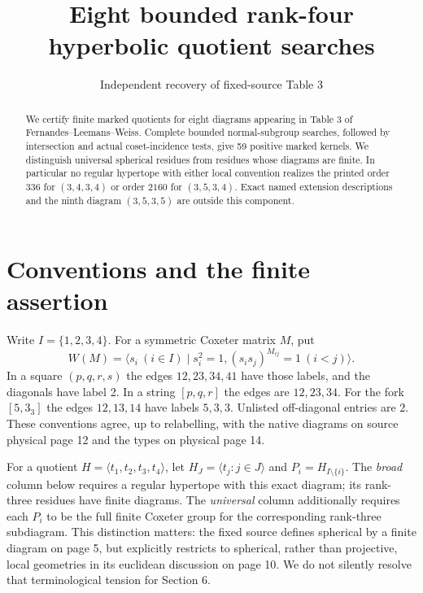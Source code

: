 \documentclass[11pt]{article}
\title{Eight bounded rank-four hyperbolic quotient searches}
\author{Independent recovery of fixed-source Table 3}
\date{}
\begin{document}
\maketitle
\begin{abstract}
We certify finite marked quotients for eight diagrams appearing in Table 3
of Fernandes--Leemans--Weiss. Complete bounded normal-subgroup searches,
followed by intersection and actual coset-incidence tests, give 59 positive
marked kernels. We distinguish universal spherical residues from residues
whose diagrams are finite. In particular no regular hypertope with either
local convention realizes the printed order $336$ for $(3,4,3,4)$ or order $2160$
for $(3,5,3,4)$. Exact named extension descriptions and the ninth diagram
$(3,5,3,5)$ are outside this component.
\end{abstract}

\section{Conventions and the finite assertion}
Write $I=\{1,2,3,4\}$. For a symmetric Coxeter matrix $M$, put
\[
 W(M)=\langle s_i\ (i\in I)\mid s_i^2=1,
                     (s_i s_j)^{M_{ij}}=1\ (i<j)\rangle.
\]
In a square $(p,q,r,s)$ the edges $12,23,34,41$ have those labels,
and the diagonals have label 2. In a string $[p,q,r]$ the edges are
$12,23,34$. For the fork $[5,3_3]$ the edges $12,13,14$ have
labels $5,3,3$. Unlisted off-diagonal entries are 2.
These conventions agree, up to relabelling, with the native diagrams on
source physical page 12 and the types on physical page 14.

For a quotient $H=\langle t_1,t_2,t_3,t_4\rangle$, let
$H_J=\langle t_j:j\in J\rangle$ and $P_i=H_{I\setminus\{i\}}$.
The \emph{broad} column below requires a regular hypertope with this
exact diagram; its rank-three residues have finite diagrams. The
\emph{universal} column additionally requires each $P_i$ to be the full
finite Coxeter group for the corresponding rank-three subdiagram.
This distinction matters: the fixed source defines spherical by a finite
diagram on page 5, but explicitly restricts to spherical, rather than
projective, local geometries in its euclidean discussion on page 10.
We do not silently resolve that terminological tension for Section 6.
\end{document}
